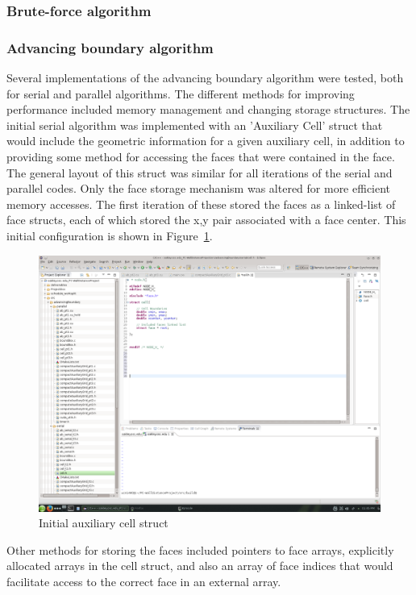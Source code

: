 \documentclass[]{aiaa-tc}%
\begin{document}
\subsubsection{Brute-force algorithm}




\subsubsection{Advancing boundary algorithm}
Several implementations of the advancing boundary algorithm were
tested, both for serial and parallel algorithms. The different methods
for improving performance included memory management and changing storage
structures. The initial serial algorithm was implemented with an
'Auxiliary Cell' struct that would include the geometric information
for a given auxiliary cell, in addition to providing some method for
accessing the faces that were contained in the face. The general
layout of this struct was similar for all iterations of the serial and
parallel codes. Only the face storage mechanism was altered for more
efficient memory accesses. The first iteration of these stored the
faces as a linked-list of face structs, each of which stored the x,y
pair associated with a face center. This initial configuration is shown in
Figure~\ref{f:initial_aux_cell}.

\begin{figure}
  \centering
  \includegraphics[trim=11.2cm 21.8cm 24cm 5.2cm,
  clip=true, width=0.3\linewidth]{figures/cells/cell_linked_list}
  \caption{Initial auxiliary cell struct}
  \label{f:initial_aux_cell}
\end{figure}

Other methods for storing the faces included pointers to face arrays,
explicitly allocated arrays in the cell struct, and also an array of
face indices that would facilitate access to the correct face in an
external array.
\end{document}

